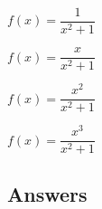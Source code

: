 \begin{shortexenum}
\item $f(x) = \dfrac{1}{x^{2} + 1}$   \label{rationalneedcalcfirst}
\item $f(x) = \dfrac{x}{x^{2} + 1}$ 
\item $f(x) = \dfrac{x^{2}}{x^{2} + 1}$ 
\item $f(x) = \dfrac{x^{3}}{x^{2} + 1}$  \label{rationalneedcalclast}
\end{shortexenum}

\clearpage

\subsection{Answers}

\startexenum

